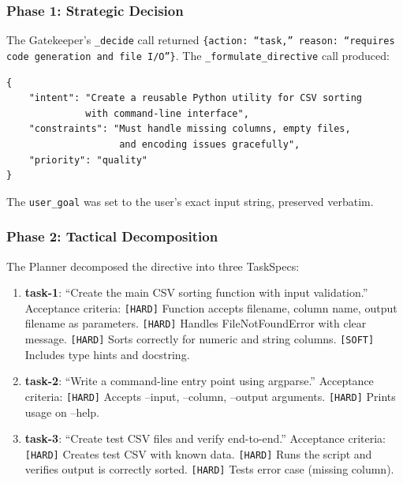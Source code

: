 \documentclass[11pt,a4paper]{article}
\begin{document}
\subsubsection*{Phase 1: Strategic Decision}

The Gatekeeper's \texttt{\_decide} call returned \texttt{\{action: ``task,''
reason: ``requires code generation and file I/O''\}}. The
\texttt{\_formulate\_directive} call produced:

\begin{lstlisting}
{
    "intent": "Create a reusable Python utility for CSV sorting
              with command-line interface",
    "constraints": "Must handle missing columns, empty files,
                    and encoding issues gracefully",
    "priority": "quality"
}
\end{lstlisting}

The \texttt{user\_goal} was set to the user's exact input string, preserved
verbatim.

\subsubsection*{Phase 2: Tactical Decomposition}

The Planner decomposed the directive into three TaskSpecs:

\begin{enumerate}[leftmargin=*,itemsep=2pt]
    \item \textbf{task-1}: ``Create the main CSV sorting function with input
    validation.'' Acceptance criteria: \texttt{[HARD]} Function accepts
    filename, column name, output filename as parameters.
    \texttt{[HARD]} Handles FileNotFoundError with clear message.
    \texttt{[HARD]} Sorts correctly for numeric and string columns.
    \texttt{[SOFT]} Includes type hints and docstring.

    \item \textbf{task-2}: ``Write a command-line entry point using argparse.''
    Acceptance criteria: \texttt{[HARD]} Accepts --input, --column,
    --output arguments. \texttt{[HARD]} Prints usage on --help.

    \item \textbf{task-3}: ``Create test CSV files and verify end-to-end.''
    Acceptance criteria: \texttt{[HARD]} Creates test CSV with known data.
    \texttt{[HARD]} Runs the script and verifies output is correctly sorted.
    \texttt{[HARD]} Tests error case (missing column).
\end{enumerate}
\end{document}
